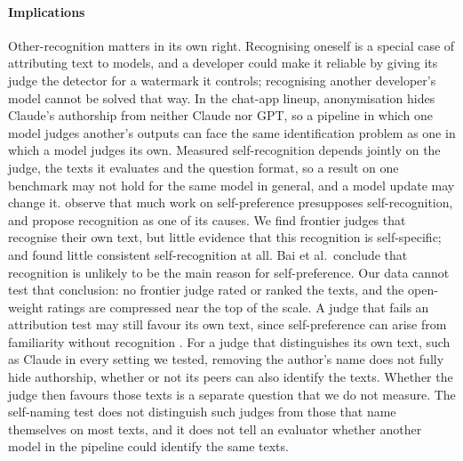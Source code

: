 \paragraph{Implications}
Other-recognition matters in its own right. Recognising oneself is a special
case of attributing text to models, and a developer could make it reliable by
giving its judge the detector for a watermark it controls; recognising another
developer's model cannot be solved that way. In the chat-app lineup,
anonymisation hides Claude's authorship from neither Claude nor GPT, so a
pipeline in which one model judges another's outputs can face the same
identification problem as one in which a model judges its own. Measured
self-recognition depends jointly on the judge, the texts it evaluates and the
question format, so a result on one benchmark may not hold for the same model
in general, and a model update may change it. \citet{bai2025selfrecognition}
observe that much work on self-preference presupposes self-recognition, and
\citet{panickssery2024selfpreference} propose recognition as one of its causes.
We find frontier judges that recognise their own text, but little evidence
that this recognition is self-specific; \citet{davidson2024anonymized} and
\citet{bai2025selfrecognition} found little consistent self-recognition at
all. Bai et al.\ conclude that
recognition is unlikely to be the main reason for self-preference. Our data
cannot test that conclusion: no frontier judge rated or ranked the texts, and
the open-weight ratings are compressed near the top of the scale. A judge
that fails an attribution test may still favour its own text, since
self-preference can arise from familiarity without recognition
\citep{wataoka2024perplexity}. For a judge that distinguishes its own text,
such as Claude in every setting we tested, removing the author's name does not
fully hide authorship, whether or not its peers can also identify the texts.
Whether the judge then favours those texts is a separate question that we do
not measure. The self-naming test does not distinguish such judges from those
that name themselves on most texts, and it does not tell an evaluator whether
another model in the pipeline could identify the same texts.

